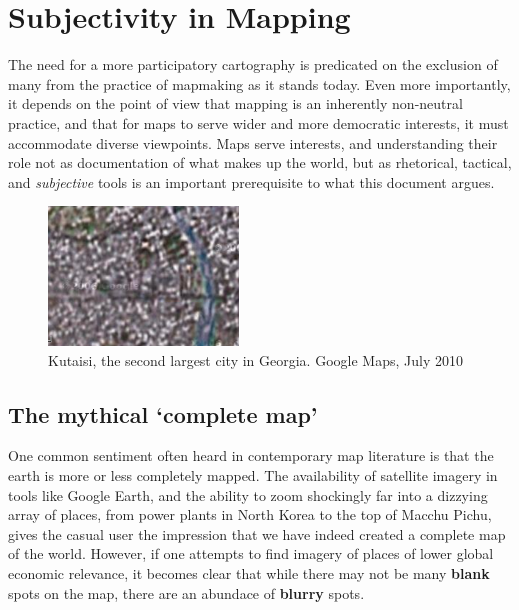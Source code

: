 \documentclass[11pt,oneside,notitlepage]{report}
\begin{document}
\chapter{Subjectivity in Mapping}
\label{chap:subjectivity}

The need for a more participatory cartography is predicated on the exclusion of many from the practice of mapmaking as it stands today. Even more importantly, it depends on the point of view that mapping is an inherently non-neutral practice, and that for maps to serve wider and more democratic interests, it must accommodate diverse viewpoints. Maps serve interests, and understanding their role not as documentation of what makes up the world, but as rhetorical, tactical, and \emph{subjective} tools is an important prerequisite to what this document argues.

\begin{figure}
	\begin{flushright}
		\includegraphics[width=0.45\textwidth]{images/kutaisi.png}
	\caption{Kutaisi, the second largest city in Georgia. Google Maps, July 2010}
	\end{flushright}
\end{figure}

\section{The mythical `complete map'}

One common sentiment often heard in contemporary map literature is that the earth is more or less completely mapped. The availability of satellite imagery in tools like Google Earth, and the ability to zoom shockingly far into a dizzying array of places, from power plants in North Korea to the top of Macchu Pichu, gives the casual user the impression that we have indeed created a complete map of the world. However, if one attempts to find imagery of places of lower global economic relevance, it becomes clear that while there may not be many \textbf{blank} spots on the map, there are an abundace of \textbf{blurry} spots. 
\end{document}
